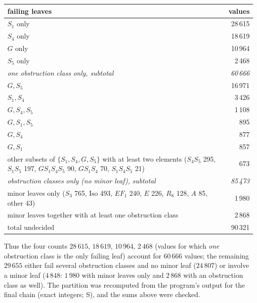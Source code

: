 \documentclass[11pt,reqno]{amsart}
\theoremstyle{plain}
\theoremstyle{definition}
\newcommand{\sS}{\textup{\textsf{S}}}
\begin{document}
\begin{center}
\begin{tabular}{p{10.5cm}r}
\hline
failing leaves & values\\
\hline
$S_1$ only & 28\,615\\
$S_4$ only & 18\,619\\
$G$ only & 10\,964\\
$S_5$ only & 2\,468\\
\emph{one obstruction class only, subtotal} & \emph{60\,666}\\
$G,S_5$ & 16\,971\\
$S_1,S_4$ & 3\,426\\
$G,S_4,S_5$ & 1\,108\\
$G,S_1,S_5$ & 895\\
$G,S_4$ & 877\\
$G,S_1$ & 857\\
other subsets of $\{S_1,S_4,G,S_5\}$ with at least two elements ($S_4S_5$ 295, $S_1S_5$ 197, $GS_1S_4S_5$ 90, $GS_1S_4$ 70, $S_1S_4S_5$ 21) & 673\\
\emph{obstruction classes only (no minor leaf), subtotal} & \emph{85\,473}\\
minor leaves only ($S_3$ 765, $\mathrm{Iso}$ 493, $E F_1$ 240, $E$ 226, $R_8$ 128, $A$ 85, other 43) & 1\,980\\
minor leaves together with at least one obstruction class & 2\,868\\
\hline
total undecided & 90\,321\\
\hline
\end{tabular}
\end{center}
Thus the four counts $28\,615$, $18\,619$, $10\,964$, $2\,468$ (values for which \emph{one} obstruction class is the only failing leaf) account for $60\,666$ values; the remaining $29\,655$ either fail several obstruction classes and no minor leaf ($24\,807$) or involve a minor leaf
($4\,848$: $1\,980$ with minor leaves only and $2\,868$ with an obstruction class as well). The partition was recomputed from the program's output for the final chain (exact integers; \sS), and the sums above were checked.
\end{document}
